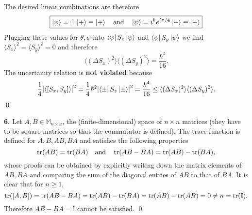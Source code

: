 \documentclass{article}
\theoremstyle{definition}
\newcommand{\f}[2]{\frac{#1}{#2}}
\begin{document}
The desired linear combinations are therefore
\begin{align*}
\boxed{\ket{\psi} = \pm \ket{+} \equiv \ket{+}\quad \text{and} \quad \ket{\psi} =  i^k e^{i\pi/4}\ket{-} \equiv \ket{-}}
\end{align*}
Plugging these values for $\theta,\phi$ into $\bra{\psi} S_x \ket{\psi}$ and $\bra{\psi} S_y \ket{\psi}$ we find $\langle S_x\rangle^2 = \langle S_y\rangle^2 = 0$ and therefore
\begin{equation*}
\langle (\Delta S_x)^2\rangle \langle (\Delta S_y)^2\rangle = \f{\hbar^4}{16}.
\end{equation*}
The uncertainty relation is \textbf{not violated} because
\begin{equation*}
\f{1}{4}\abs{\langle [S_x, S_y]\rangle}^2 = \f{1}{4}\hbar^2 \abs{\bra{\pm}S_z\ket{\pm}}^2 = \f{\hbar^4}{16} \leq  \langle (\Delta S_x)^2\rangle \langle (\Delta S_y)^2\rangle.
\end{equation*}\qed
	
	
	
	
	
	
	
	
\newpage




\noindent \textbf{6.} Let $A,B \in \mathbb{M}_{n\times n}$, the (finite-dimensional) space of $n\times n$ matrices (they have to be square matrices so that the commutator is defined). The trace function is defined for $A,B,AB,BA$ and satisfies the following properties
\begin{equation*}
\tr(AB) = \tr(BA)  \quad \text{and} \quad \tr(AB-BA) = \tr(AB) - \tr(BA),
\end{equation*}
whose proofs can be obtained by explicitly writing down the matrix elements of $AB,BA$ and comparing the sum of the diagonal entries of $AB$ to that of $BA$. It is clear that for $n\geq 1$,
\begin{equation*}
\tr([A,B]) = \tr(AB-BA) = \tr(AB) - \tr(BA) = \tr(AB) - \tr(AB)  = 0 \neq n = \tr(\mathbb{I}). 
\end{equation*}
Therefore $AB-BA = \mathbb{I}$ cannot be satisfied. \qed
	

\newpage
\end{document}
